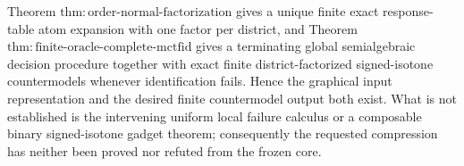 Theorem \(\mathrm{thm:order\text{-}normal\text{-}factorization}\) gives a unique finite exact response-table atom expansion with one factor per district, and Theorem \(\mathrm{thm:finite\text{-}oracle\text{-}complete\text{-}mctfid}\) gives a terminating global semialgebraic decision procedure together with exact finite district-factorized signed-isotone countermodels whenever identification fails. Hence the graphical input representation and the desired finite countermodel output both exist. What is not established is the intervening uniform local failure calculus or a composable binary signed-isotone gadget theorem; consequently the requested compression has neither been proved nor refuted from the frozen core.